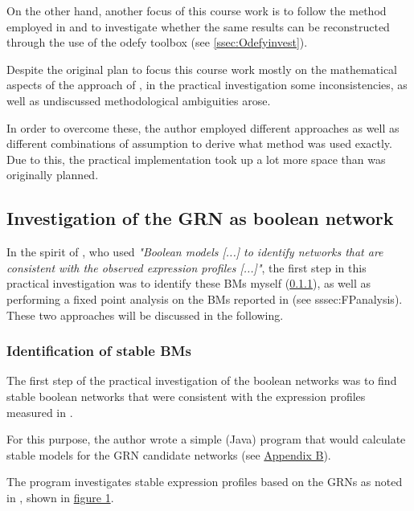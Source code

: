 \documentclass[11pt]{article}
\begin{document}
On the other hand, another focus of this course work is to follow the method employed in \cite{Kirkham} and to investigate whether the same results can be reconstructed through the use of the odefy toolbox (see \ref{ssec:Odefyinvest}).

Despite the original plan to focus this course work mostly on the mathematical aspects of the approach of \cite{Kirkham}, in the practical investigation some inconsistencies, as well as undiscussed methodological ambiguities arose.

In order to overcome these, the author employed different approaches as well as different combinations of assumption to derive what method was used exactly. Due to this, the practical implementation took up a lot more space than was originally planned.

\subsection{Investigation of the GRN as boolean network} \label{ssec:BMinvest}
In the spirit of \cite{Kirkham}, who used \textit{"Boolean models [...] to identify networks that are consistent with the observed expression profiles [...]"}, the first step in this practical investigation was to identify these BMs myself (\ref{sssec:BMidentification}), as well as performing a fixed point analysis on the BMs reported in \cite{Kirkham} (see {sssec:FPanalysis}).
These two approaches will be discussed in the following.

\subsubsection{Identification of stable BMs} \label{sssec:BMidentification}
The first step of the practical investigation of the boolean networks was to find stable boolean networks that were consistent with the expression profiles measured in \cite{Kirkham}.

For this purpose, the author wrote a simple (Java) program that would calculate stable models for the GRN candidate networks (see \hyperref[AppendixB]{Appendix B}).

The program investigates stable expression profiles based on the GRNs as noted in \cite{Kirkham}, shown in \hyperref[GRNs]{figure 1}.
\end{document}
